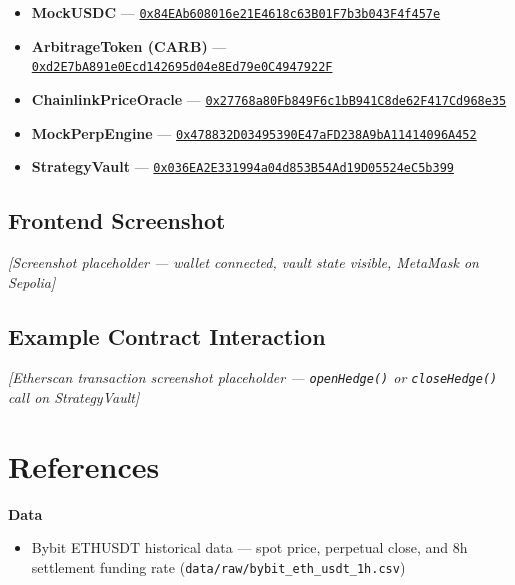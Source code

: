\documentclass[11pt,a4paper]{article}
\begin{document}
\begin{itemize}
    \item \textbf{MockUSDC} --- \href{https://sepolia.etherscan.io/address/0x84EAb608016e21E4618c63B01F7b3b043F4f457e}{\texttt{0x84EAb608016e21E4618c63B01F7b3b043F4f457e}}
    \item \textbf{ArbitrageToken (CARB)} --- \href{https://sepolia.etherscan.io/address/0xd2E7bA891e0Ecd142695d04e8Ed79e0C4947922F}{\texttt{0xd2E7bA891e0Ecd142695d04e8Ed79e0C4947922F}}
    \item \textbf{ChainlinkPriceOracle} --- \href{https://sepolia.etherscan.io/address/0x27768a80Fb849F6c1bB941C8de62F417Cd968e35}{\texttt{0x27768a80Fb849F6c1bB941C8de62F417Cd968e35}}
    \item \textbf{MockPerpEngine} --- \href{https://sepolia.etherscan.io/address/0x478832D03495390E47aFD238A9bA11414096A452}{\texttt{0x478832D03495390E47aFD238A9bA11414096A452}}
    \item \textbf{StrategyVault} --- \href{https://sepolia.etherscan.io/address/0x036EA2E331994a04d853B54Ad19D05524eC5b399}{\texttt{0x036EA2E331994a04d853B54Ad19D05524eC5b399}}
\end{itemize}

\subsection*{Frontend Screenshot}

\begin{center}
\textit{[Screenshot placeholder --- wallet connected, vault state visible, MetaMask on Sepolia]}
\end{center}

\subsection*{Example Contract Interaction}

\begin{center}
\textit{[Etherscan transaction screenshot placeholder --- \texttt{openHedge()} or \texttt{closeHedge()} call on StrategyVault]}
\end{center}

\section{References}

\textbf{Data}
\begin{itemize}
    \item Bybit ETHUSDT historical data --- spot price, perpetual close, and 8h settlement funding rate (\texttt{data/raw/bybit\_eth\_usdt\_1h.csv})
\end{itemize}
\end{document}
